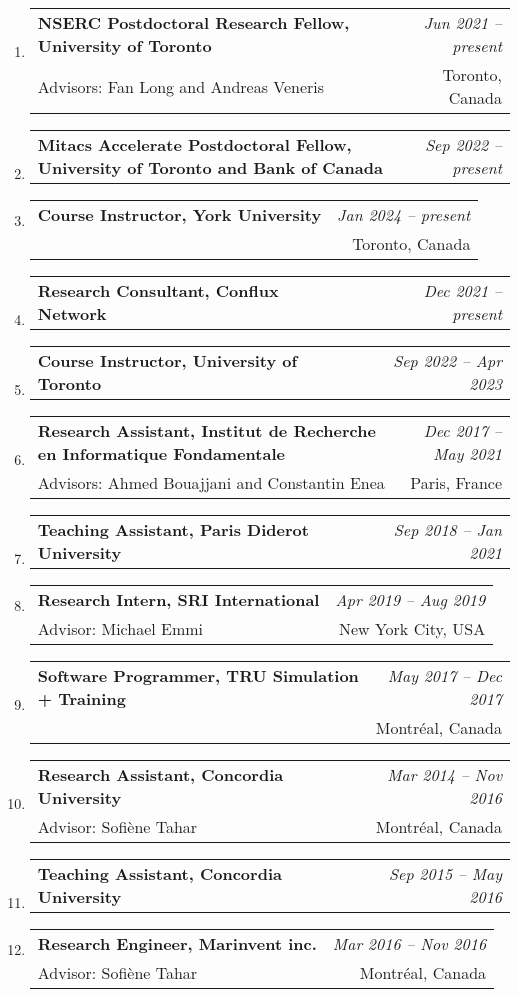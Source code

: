 \documentclass[10pt]{article}
\makeatletter
\newcommand{\lbar}[1]{{\color{#1}\ding{118}}\hspace*{2pt}}
\newenvironment{benumerate}[2]{
    \let\oldItem\item
    \def\item{\addtocounter{enumi}{-2}\oldItem}
    \begin{enumerate}[#2] \itemsep3pt
    \setcounter{enumi}{#1}
    \addtocounter{enumi}{1}}
  {\end{enumerate}}
\newcommand{\positionnodesc}[2]
{%
\item
  \begin{tabular*}{7.5in}{l@{\extracolsep{\fill}}r}
    \textbf{#1} & \textit{#2}
  \end{tabular*}
}
\newenvironment{position}[4]
{%
\item
  \begin{tabular*}{7.5in}{l@{\extracolsep{\fill}}r}
    \textbf{#1} & \textit{#2} \\
    \hspace{1ex} #3 & \small{#4} \\
  \end{tabular*}
  }
  { %
}
\newenvironment{region}[3]{%
  \vspace*{0.5ex}
  {\scalebox{1.4}{\textbf{#1}}}
  \begin{benumerate}{#3}{\color{RoyalBlue}#2}}
  {\end{benumerate}\vspace{0.8ex}}
\newenvironment{nonumregion}[1]{%
\begin{region}{#1}{}{1}}
{\end{region}}
\makeatother
\begin{document}
\begin{nonumregion} {\lbar{black}Experience}
  \begin{position}{NSERC Postdoctoral Research Fellow, University of Toronto}{Jun 2021 -- present}
		{Advisors: Fan Long and Andreas Veneris}{Toronto, Canada}
  \end{position}
  \positionnodesc{Mitacs Accelerate Postdoctoral Fellow, University of Toronto and Bank of Canada}{Sep 2022 -- present}
  \begin{position}{Course Instructor, York University}{Jan 2024 -- present}
		{}{Toronto, Canada}
  \end{position}
  \positionnodesc{Research Consultant, Conflux Network}{Dec 2021 -- present}
  \positionnodesc{Course Instructor, University of Toronto}{Sep 2022 -- Apr 2023}
  \begin{position}{Research Assistant, Institut de Recherche en Informatique Fondamentale}{Dec 2017 -- May 2021}
		{Advisors: Ahmed Bouajjani and Constantin Enea}{Paris, France}
  \end{position}
  \positionnodesc{Teaching Assistant, Paris Diderot University}{Sep 2018 -- Jan 2021}
  \begin{position}{Research Intern, SRI International}{Apr 2019 -- Aug 2019}
		{Advisor: Michael Emmi}{New York City, USA}
  \end{position}
  \begin{position}{Software Programmer, TRU Simulation + Training}{May 2017 -- Dec 2017}
      {}{Montr\'{e}al, Canada}
  \end{position}
  \begin{position}{Research Assistant, Concordia University}{Mar 2014 -- Nov 2016}
		{Advisor: Sofi\`{e}ne Tahar}{Montr\'{e}al, Canada}
  \end{position}
  \positionnodesc{Teaching Assistant, Concordia University}{Sep 2015 -- May 2016}
  \begin{position}{Research Engineer, Marinvent inc.}{Mar 2016 -- Nov 2016}
		{Advisor: Sofi\`{e}ne Tahar}{Montr\'{e}al, Canada}
  \end{position}
  

\end{nonumregion}
\end{document}
